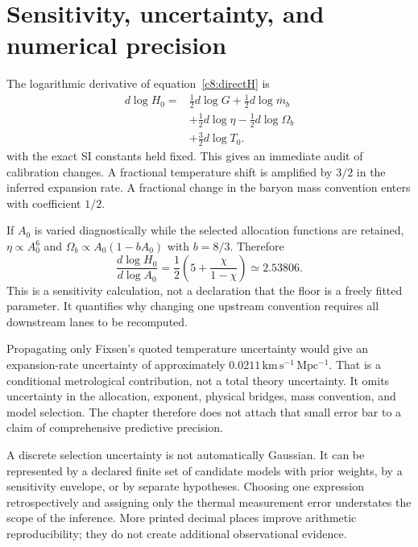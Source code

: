 \section{Sensitivity, uncertainty, and numerical precision}
The logarithmic derivative of equation~\eqref{c8:directH} is
\begin{equation}
 \begin{aligned}
 d\log H_0={}&\tfrac12d\log G+\tfrac12d\log\overline m_b\\
 &+\tfrac12d\log\eta-\tfrac12d\log\Omega_b\\
 &+\tfrac32d\log T_0.
 \end{aligned}
 \label{c8:sensitivity}
\end{equation}
with the exact SI constants held fixed. This gives an immediate audit of calibration changes. A fractional temperature shift is amplified by $3/2$ in the inferred expansion rate. A fractional change in the baryon mass convention enters with coefficient $1/2$.

If $A_0$ is varied diagnostically while the selected allocation functions are retained, $\eta\propto A_0^6$ and $\Omega_b\propto A_0(1-bA_0)$ with $b=8/3$. Therefore
\begin{equation}
 \frac{d\log H_0}{d\log A_0}
 =\frac12\left(5+\frac{\chi}{1-\chi}\right)
 \simeq2.53806.
 \label{c8:floorresponse}
\end{equation}
This is a sensitivity calculation, not a declaration that the floor is a freely fitted parameter. It quantifies why changing one upstream convention requires all downstream lanes to be recomputed.

Propagating only Fixsen's quoted temperature uncertainty would give an expansion-rate uncertainty of approximately $0.0211\,\mathrm{km\,s^{-1}\,Mpc^{-1}}$. That is a conditional metrological contribution, not a total theory uncertainty. It omits uncertainty in the allocation, exponent, physical bridges, mass convention, and model selection. The chapter therefore does not attach that small error bar to a claim of comprehensive predictive precision.

A discrete selection uncertainty is not automatically Gaussian. It can be represented by a declared finite set of candidate models with prior weights, by a sensitivity envelope, or by separate hypotheses. Choosing one expression retrospectively and assigning only the thermal measurement error understates the scope of the inference. More printed decimal places improve arithmetic reproducibility; they do not create additional observational evidence.

